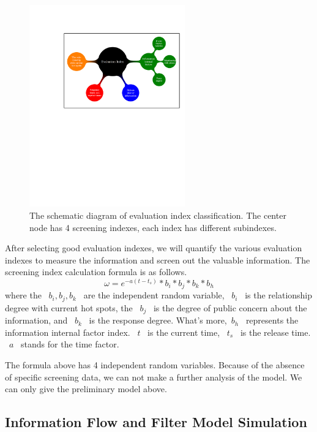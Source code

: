 \documentclass[a4paper,11pt]{article}
\begin{document}
\begin{figure}[h]%
    \centering 
    \includegraphics[width=0.6\textwidth]{./Pic/The_schematic_diagram_of_evaluation_index_classification.pdf}
    \caption{The schematic diagram of evaluation index classification. The center node has 4 screening indexes, each index has different subindexes.}
    \label{fig:The_schematic_diagram_of_evaluation_index_classification}  
\end{figure}

\par After selecting good evaluation indexes, we will quantify the various evaluation indexes to measure the information and screen out the valuable information. The screening index calculation formula is as follows.
\begin{equation}
\omega=e^{-a(t-t_s)}*b _i*b _j*b _k*b_h
\end{equation}
where the ~$b _i,b _j,b _k$~ are the independent random variable, ~$b _i$~ is the relationship degree with current hot spots, the ~$b _j$~ is the degree of public concern about the information, and ~$b _k$~ is the response degree. What's more,~$b_h$~ represents the  information internal factor index. ~$t$~ is the current time, ~$t_s$~ is the release time. ~$a$~ stands for the time factor.
\par The formula above has 4 independent random variables. Because of the absence of specific screening data, we can not make a further analysis of the model. We can only give the preliminary model above.


\subsection{Information Flow and Filter Model Simulation}
\end{document}
